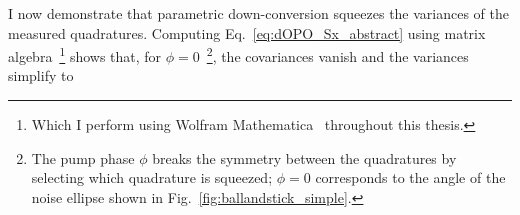 I now demonstrate that parametric down-conversion squeezes the variances of the measured quadratures.
Computing Eq.~\ref{eq:dOPO_Sx_abstract} using matrix algebra~\footnote{Which I perform using Wolfram Mathematica~\cite{mathematica} throughout this thesis.} shows that, for $\phi=0$~\footnote{The pump phase $\phi$ breaks the symmetry between the quadratures by selecting which quadrature is squeezed; $\phi=0$ corresponds to the angle of the noise ellipse shown in Fig.~\ref{fig:ballandstick_simple}.}, the covariances vanish and the variances simplify to
